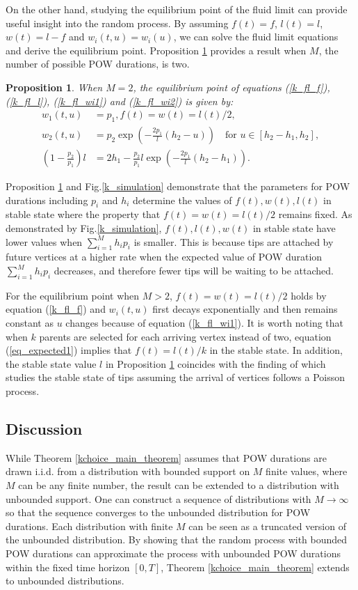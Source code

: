 \documentclass[12pt]{article}
\numberwithin{equation}{section}  %
\newtheorem{prop}[thm]{Proposition}
\begin{document}
On the other hand, studying the equilibrium point of the fluid limit can provide useful insight into the random process. By assuming $f(t)=f$, $l(t)=l$, $w(t)=l-f$ and $w_i(t,u)=w_i(u)$, we can solve the fluid limit equations and derive the equilibrium point. Proposition \ref{k_equili_2} provides a result when $M$, the number of possible POW durations, is two.
\begin{prop}\label{k_equili_2}
    When $M=2$, the equilibrium point of equations (\ref{k_fl_f}), (\ref{k_fl_l}), (\ref{k_fl_wi1}) and (\ref{k_fl_wi2}) is given by:
    \begin{align*}
    w_1(t,u)&=p_1,f(t)=w(t)=l(t)/2,\\
    w_2(t,u)&=p_2\exp{\left(-\frac{2p_1}{l}(h_2-u)\right)}\quad\text{for } u\in[h_2-h_1,h_2],\\
    \left(1 - \frac{p_2}{p_1}\right)  l &= 2 h_1 - \frac{p_2}{p_1}  l  \exp\left(- \frac{2 p_1}{l}  (h_2 - h_1)\right).
    \end{align*}
\end{prop}

Proposition \ref{k_equili_2} and Fig.\ref{k_simulation} demonstrate that the parameters for POW durations including $p_i$ and $h_i$ determine the values of $f(t),w(t),l(t)$ in stable state where the property that $f(t)=w(t)=l(t)/2$ remains fixed. As demonstrated by Fig.\ref{k_simulation}, $f(t),l(t), w(t)$ in stable state have lower values when $\sum_{i=1}^Mh_ip_i$ is smaller. This is because tips are attached by future vertices at a higher rate when the expected value of POW duration $\sum_{i=1}^Mh_ip_i$ decreases, and therefore fewer tips will be waiting to be attached.

For the equilibrium point when $M>2$, $f(t)=w(t)=l(t)/2$ holds by equation (\ref{k_fl_f}) and $w_i(t,u)$ first decays exponentially and then remains constant as $u$ changes because of equation (\ref{k_fl_wi1}). It is worth noting that when $k$ parents are selected for each arriving vertex instead of two,
equation (\ref{eq_expected1}) implies that $f(t)=l(t)/k$ in the stable state. In addition, the stable state value $l$ in Proposition \ref{k_equili_2} coincides with the finding of \cite{Pen21} which studies the stable state of tips assuming the arrival of vertices follows a Poisson process.



\subsection{Discussion}
While Theorem \ref{kchoice_main_theorem} assumes that POW durations are drawn i.i.d. from a distribution with bounded support on $M$ finite values, where $M$ can be any finite number, the result can be extended to a distribution with unbounded support. One can construct a sequence of distributions with $M\rightarrow \infty$ so that the sequence converges to the unbounded distribution for POW durations. Each distribution with finite $M$ can be seen as a truncated version of the unbounded distribution. By showing that the random process with bounded POW durations can approximate the process with unbounded POW durations within the fixed time horizon $[0,T]$, Theorem \ref{kchoice_main_theorem} extends to unbounded distributions. 
\end{document}
